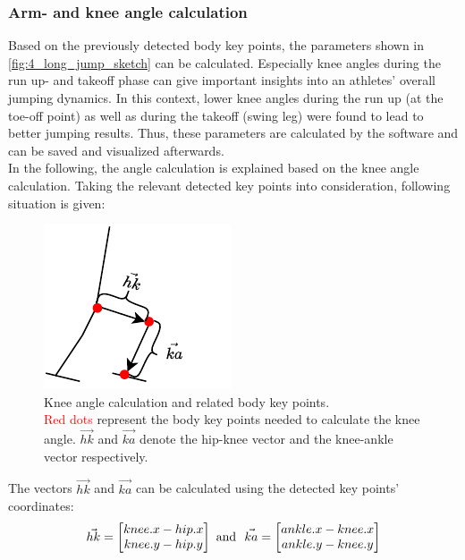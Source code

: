 \subsubsection*{Arm- and knee angle calculation}
Based on the previously detected body key points, the parameters shown in
\autoref{fig:4_long_jump_sketch} can be calculated.
Especially knee angles during the run up- and takeoff phase can give important
insights into an athletes' overall jumping dynamics.
In this context, lower knee angles during the run up (at the toe-off point) as
well as during the takeoff (swing leg) were found to lead to better jumping
results\cite{mattes_kinematic_2021}.
Thus, these parameters are calculated by the software and can be saved and
visualized afterwards.\\
In the following, the angle calculation is explained based on the knee angle
calculation.
Taking the relevant detected key points into consideration, following
situation is given:
\begin{figure}[!h]
    \centering
    \includegraphics[scale=0.9]{knee_angles_calc.pdf}
    \caption[Knee angle calculation]{Knee angle calculation and related body
    key points.\\
    \textcolor{red}{Red dots} represent the body key points needed to calculate
    the knee angle. $\vec{hk}$ and $\vec{ka}$ denote the hip-knee vector and
    the knee-ankle vector respectively.}
    \label{fig:4_knee_angle_calculation}
\end{figure}
\FloatBarrier
\noindent The vectors $\vec{hk}$ and $\vec{ka}$ can be calculated using the
detected key points' coordinates:
\begin{equation}\label{eq:knee_angle_vectors}
    \vec{hk} = \begin{bmatrix}
        knee.x - hip.x \\
        knee.y - hip.y
    \end{bmatrix} \\
    \text{\ and \ }
    \hfill
    \vec{ka} = \begin{bmatrix}
        ankle.x - knee.x \\
        ankle.y - knee.y
    \end{bmatrix}
\end{equation}
